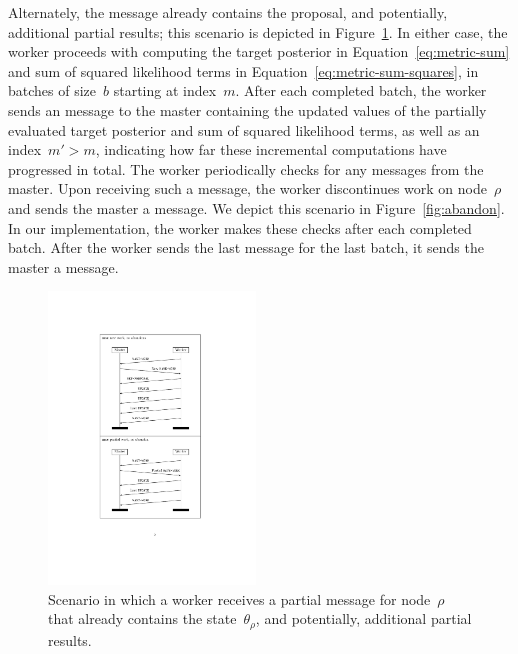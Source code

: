 \documentclass[angelino.tex]{subfiles}
\begin{document}
Alternately, the \HAVEWORK message already contains the proposal,
and potentially, additional partial results; this scenario is depicted in Figure~\ref{fig:partial-work}.
%
In either case, the worker proceeds with computing the target posterior in 
Equation~\ref{eq:metric-sum} and sum of squared likelihood terms in 
Equation~\ref{eq:metric-sum-squares}, in batches of size~$b$ starting at index~$m$.
%	
After each completed batch, the worker sends an \UPDATE message to the
master containing the updated values of the partially evaluated
target posterior and sum of squared likelihood terms,
as well as an index~$m' > m$, indicating how far these
incremental computations have progressed in total.
%
The worker periodically checks for any \ABANDON messages from the
master.
Upon receiving such a message, the worker discontinues work on
node~$\rho$ and sends the master a \WANTWORK message.
We depict this scenario in Figure~\ref{fig:abandon}.
In our implementation, the worker makes these checks after each completed batch.
%
After the worker sends the last \UPDATE message for the last batch,
it sends the master a \WANTWORK message.

\begin{figure}[t]
\centering
\includegraphics[width=0.49\textwidth]{figs/protocol/partial-work.pdf}
\caption{Scenario in which a worker receives a partial \HAVEWORK message
for node~$\rho$ that already contains the state~$\theta_\rho$,
and potentially, additional partial results.}
\label{fig:partial-work}
\end{figure}
\end{document}
